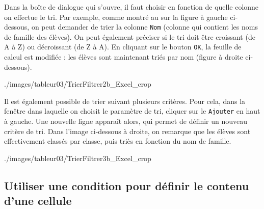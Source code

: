 
Dans la boîte de dialogue qui s'ouvre, il faut choisir en fonction de quelle colonne on effectue le tri. Par exemple, comme montré au  sur la figure à gauche ci-dessous, on peut demander de trier la colonne \texttt{Nom} (colonne qui contient les noms de famille des élèves). On peut également préciser  si le tri doit être croissant (de A à Z) ou décroissant (de Z à A). En cliquant sur le bouton \texttt{OK}, la feuille de calcul est modifiée : les élèves sont maintenant triés par nom (figure à droite ci-dessous).

%
{./images/tableur03/TrierFiltrer2b_Excel_crop}{\textwidth}

Il est également possible de trier suivant plusieurs critères. Pour cela, dans la fenêtre dans laquelle on choisit le paramètre de tri, cliquer sur le \texttt{Ajouter} en haut à gauche. Une nouvelle ligne apparaît alors, qui permet de définir un nouveau critère de tri. Dans l'image ci-dessous à droite, on remarque que les élèves sont effectivement classés par classe, puis triès en fonction du nom de famille.

%
{./images/tableur03/TrierFiltrer3b_Excel_crop}{\textwidth}













\subsection{Utiliser une condition pour définir le contenu d'une cellule}\label{Calc3Condition}

